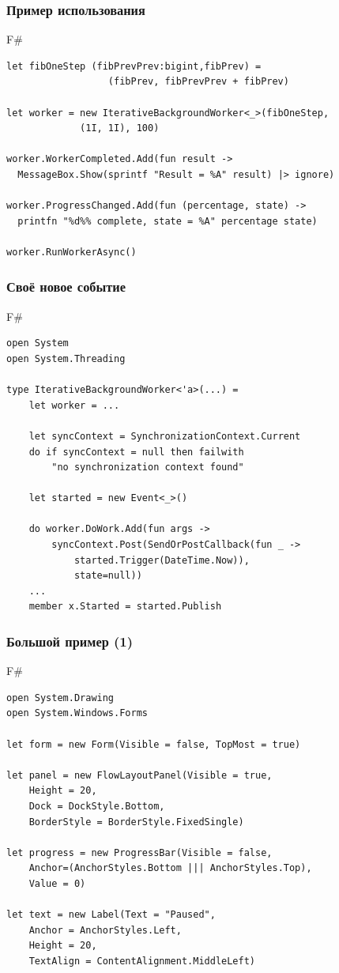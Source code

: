 \documentclass[xetex,mathserif,serif]{beamer}
\begin{document}
    \begin{frame}[fragile]
        \frametitle{Пример использования}
        \begin{exampleblock}{F\#}
            \begin{lstlisting}
let fibOneStep (fibPrevPrev:bigint,fibPrev) = 
                  (fibPrev, fibPrevPrev + fibPrev)

let worker = new IterativeBackgroundWorker<_>(fibOneStep,
             (1I, 1I), 100)

worker.WorkerCompleted.Add(fun result ->
  MessageBox.Show(sprintf "Result = %A" result) |> ignore)

worker.ProgressChanged.Add(fun (percentage, state) ->
  printfn "%d%% complete, state = %A" percentage state)

worker.RunWorkerAsync()
\end{lstlisting}
\end{exampleblock}
\end{frame}

    \begin{frame}[fragile]
        \frametitle{Своё новое событие}
        \begin{exampleblock}{F\#}
            \begin{lstlisting}[basicstyle=\scriptsize]
open System
open System.Threading

type IterativeBackgroundWorker<'a>(...) =
    let worker = ...

    let syncContext = SynchronizationContext.Current
    do if syncContext = null then failwith 
        "no synchronization context found"
    
    let started = new Event<_>()

    do worker.DoWork.Add(fun args ->
        syncContext.Post(SendOrPostCallback(fun _ -> 
            started.Trigger(DateTime.Now)),
            state=null))
    ...
    member x.Started = started.Publish
\end{lstlisting}
\end{exampleblock}
\end{frame}

    \begin{frame}[fragile]
        \frametitle{Большой пример (1)}
        \begin{exampleblock}{F\#}
            \begin{lstlisting}[basicstyle=\scriptsize]
open System.Drawing
open System.Windows.Forms

let form = new Form(Visible = false, TopMost = true)

let panel = new FlowLayoutPanel(Visible = true,
    Height = 20,
    Dock = DockStyle.Bottom,
    BorderStyle = BorderStyle.FixedSingle)

let progress = new ProgressBar(Visible = false,
    Anchor=(AnchorStyles.Bottom ||| AnchorStyles.Top),
    Value = 0)

let text = new Label(Text = "Paused",
    Anchor = AnchorStyles.Left,
    Height = 20,
    TextAlign = ContentAlignment.MiddleLeft)
\end{lstlisting}
\end{exampleblock}
\end{frame}
\end{document}
